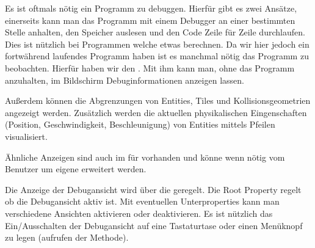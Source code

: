 Es ist oftmals nötig ein Programm zu debuggen. Hierfür gibt es zwei Ansätze, einerseits kann man das Programm mit einem Debugger an einer bestimmten Stelle anhalten, den Speicher auslesen und den Code Zeile für Zeile durchlaufen.
Dies ist nützlich bei Programmen welche etwas berechnen. Da wir hier jedoch ein fortwährend laufendes Programm haben ist es manchmal nötig das Programm  zu beobachten. Hierfür haben wir den . Mit ihm kann man, ohne das Programm anzuhalten, im Bildschirm Debuginformationen anzeigen lassen.


Außerdem können die Abgrenzungen von Entities, Tiles und Kollisionsgeometrien angezeigt werden. Zusätzlich werden die aktuellen physikalischen Eingenschaften (Position, Geschwindigkeit, Beschleunigung) von Entities mittels Pfeilen visualisiert.

Ähnliche Anzeigen sind auch im  für  vorhanden und könne wenn nötig vom Benutzer um eigene erweitert werden.


Die Anzeige der Debugansicht wird über die  geregelt. Die Root Property  regelt ob die Debugansicht aktiv ist. Mit eventuellen Unterproperties kann man verschiedene Ansichten aktivieren oder deaktivieren. Es ist nützlich das Ein/Ausschalten der Debugansicht auf eine Tastaturtase oder einen Menüknopf zu legen (aufrufen der  Methode).